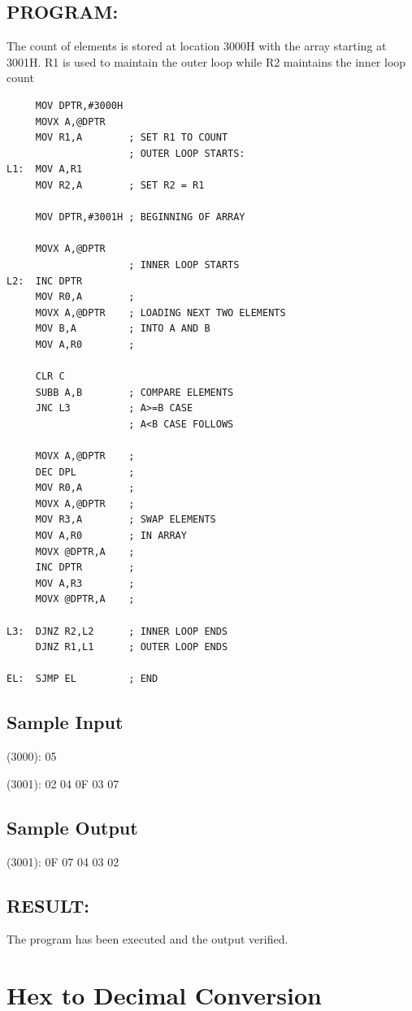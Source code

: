 \documentclass[a4paper,28pt]{report}
\begin{document}
\section*{PROGRAM:}
The count of elements is stored at location 3000H with the array starting at 3001H. R1 is used to maintain the outer loop while R2 maintains the inner loop count
\begin{lstlisting}
     MOV DPTR,#3000H
     MOVX A,@DPTR
     MOV R1,A        ; SET R1 TO COUNT
                     ; OUTER LOOP STARTS:
L1:  MOV A,R1
     MOV R2,A        ; SET R2 = R1
     
     MOV DPTR,#3001H ; BEGINNING OF ARRAY
     
     MOVX A,@DPTR
                     ; INNER LOOP STARTS
L2:  INC DPTR 
     MOV R0,A        ;
     MOVX A,@DPTR    ; LOADING NEXT TWO ELEMENTS
     MOV B,A         ; INTO A AND B 
     MOV A,R0        ;
     
     CLR C
     SUBB A,B        ; COMPARE ELEMENTS
     JNC L3          ; A>=B CASE
                     ; A<B CASE FOLLOWS
            
     MOVX A,@DPTR    ;
     DEC DPL         ;
     MOV R0,A        ;
     MOVX A,@DPTR    ; 
     MOV R3,A        ; SWAP ELEMENTS
     MOV A,R0        ; IN ARRAY
     MOVX @DPTR,A    ;
     INC DPTR        ;
     MOV A,R3        ;
     MOVX @DPTR,A    ;
     
L3:  DJNZ R2,L2      ; INNER LOOP ENDS
     DJNZ R1,L1      ; OUTER LOOP ENDS
     
EL:  SJMP EL         ; END
\end{lstlisting}

\section*{Sample Input}
(3000): 05

(3001): 02
 04
 0F
 03
 07

\section*{Sample Output}
(3001): 0F 
 07 
 04
 03
 02

\section*{RESULT:}
The program has been executed and the output verified.
%
%
\chapter{Hex to Decimal Conversion}
\end{document}
